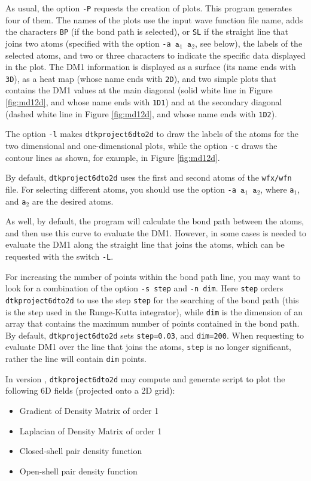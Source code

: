 As usual, the option \texttt{-P} requests the creation of plots. This program generates four of them. The names of the plots use the input wave function file name, adds the characters \texttt{BP} (if the bond path is selected), or \texttt{SL} if the straight line that joins two atoms (specified with the option \texttt{-a $\mathtt{a}_1$ $\mathtt{a}_2$}, see below), the labels of the selected atoms, and two or three characters to indicate the specific data displayed in the plot. The DM1 information is displayed as a surface (its name ends with \texttt{3D}), as a heat map (whose name ends with \texttt{2D}), and two simple plots that contains the DM1 values at the main diagonal (solid white line in Figure \ref{fig:md12d}, and whose name ends with \texttt{1D1}) and at the secondary diagonal (dashed white line in Figure \ref{fig:md12d}, and whose name ends with \texttt{1D2}).

The option \texttt{-l} makes \texttt{dtkproject6dto2d} to draw the labels of the atoms for the two dimensional and one-dimensional plots, while the option \texttt{-c} draws the contour lines as shown, for example, in Figure \ref{fig:md12d}.

By default, \texttt{dtkproject6dto2d} uses the first and second atoms of the \texttt{wfx/wfn} file. For selecting different atoms, you should use the option \texttt{-a $\mathtt{a}_1$ $\mathtt{a}_2$}, where \texttt{a}$_1$, and \texttt{a}$_2$ are the desired atoms.

As well, by default, the program will calculate the bond path between the atoms, and then use this curve to evaluate the DM1. However, in some cases is needed to evaluate the DM1 along the straight line that joins the atoms, which can be requested with the switch \texttt{-L}.

For increasing the number of points within the bond path line, you may want to look for a combination of the option \texttt{-s step} and \texttt{-n dim}. Here \texttt{step} orders \texttt{dtkproject6dto2d} to use the step \texttt{step} for the searching of the bond path (this is the step used in the Runge-Kutta integrator), while \texttt{dim} is the dimension of an array that contains the maximum number of points contained in the bond path. By default, \texttt{dtkproject6dto2d} sets \texttt{step=0.03}, and \texttt{dim=200}. When requesting to evaluate DM1 over the line that joins the atoms, \texttt{step} is no longer significant, rather the line will contain \texttt{dim} points.

In version \dtkversion, \texttt{dtkproject6dto2d} may compute and generate script to plot
the following 6D fields (projected onto a 2D grid):
\begin{itemize}
	\item Gradient of Density Matrix of order 1
	\item Laplacian of Density Matrix of order 1
	\item Closed-shell pair density function
	\item Open-shell pair density function
\end{itemize}

